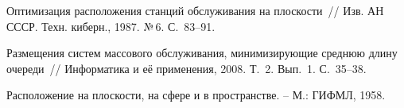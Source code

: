 \begin{multicols}{2}
{{\begin{thebibliography}{9}
Оптимизация расположения станций обслуживания на плоскости~//
Изв. АН СССР. Техн. киберн., 1987. №\,6. С.~83--91.

Размещения систем массового обслуживания, минимизирующие среднюю
длину очереди~// Информатика и её применения, 2008. Т.~2. Вып.~1. С.~35--38.

\label{end\stat}

Расположение на плоскости, на сфере и в пространстве. -- М.: ГИФМЛ, 1958.


\end{thebibliography}

}
}
\end{multicols}